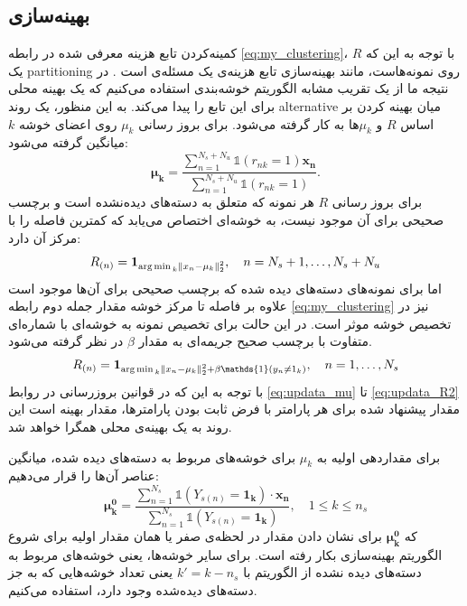 \subsection{بهینه‌سازی}\label{simple_opt}
 کمینه‌کردن تابع هزینه معرفی شده در رابطه
\eqref{eq:my_clustering}،
با توجه به این که $R$ یک \gls{partitioning} روی نمونه‌هاست، مانند بهینه‌سازی تابع هزینه‌ی  یک مسئله‌ی \nphard است \cite{kmeans_nphard}. در نتیجه ما از یک تقریب
مشابه الگوریتم خوشه‌بندی  استفاده می‌کنیم که یک بهینه محلی برای این تابع را پیدا می‌کند. به این منظور،  یک روند \gls{alternative}  میان بهینه کردن بر اساس $R$ و $\mu_k$ها به کار گرفته می‌شود. برای بروز رسانی $\mu_k$ روی اعضای خوشه $k$ میانگین گرفته می‌شود:
\begin{equation} \label{eq:updata_mu}
 \boldsymbol{\mu_k} = \frac{\sum_{n=1}^{N_s + N_u}  \mathds{1}(r_{nk}=1)\mathbf{x_n}}{\sum_{n=1}^{N_s+N_u}\mathds{1}(r_{nk}=1)}.
\end{equation}
برای بروز رسانی $R$ هر نمونه که متعلق به دسته‌های دیده‌نشده است و برچسب صحیحی برای آن موجود نیست، به خوشه‌ای اختصاص می‌یابد که کمترین فاصله را با مرکز آن دارد:
\begin{equation} \label{eq:updata_R}
R_{(n)} = \mathbf{1}_{\operatorname*{arg\,min\,}_k \left \lVert x_n - \mu_k \right \rVert_2^2}, \quad n=N_s+1,\ldots,N_s+N_u
\end{equation}
اما برای نمونه‌های دسته‌های دیده شده که برچسب صحیحی برای آن‌ها موجود است علاوه بر فاصله تا مرکز خوشه مقدار جمله دوم رابطه \eqref{eq:my_clustering} نیز در تخصیص خوشه موثر است. در این حالت برای تخصیص نمونه به خوشه‌ای با شماره‌ای متفاوت با برچسب صحیح جریمه‌ای به مقدار $\beta$ در نظر گرفته می‌شود.
\begin{align}\label{eq:updata_R2}
R_{(n)} = \mathbf{1}_{\argmin_k \normtwo{x_n - \mu_k} + \beta \mathds{1}(y_n \neq 1_k)}, \quad n=1,\ldots,N_s
\end{align}
با توجه به این که در قوانین بروزرسانی در روابط \eqref{eq:updata_mu} تا \eqref{eq:updata_R2} مقدار پیشنهاد شده برای هر پارامتر با فرض ثابت بودن پارامترها، مقدار بهینه است این روند به یک بهینه‌ی محلی همگرا خواهد شد.

برای مقداردهی اولیه به $\mu_k$ برای  خوشه‌های مربوط به دسته‌های دیده شده، میانگین عناصر آن‌ها را قرار می‌دهیم:
\begin{equation} \label{eq:init_mu}
 \boldsymbol{\mu_k^0} = \frac{\sum_{n=1}^{N_s}  \mathds{1}(Y_{s(n)} = \mathbf{1_k})\cdot \mathbf{x_n}}{\sum_{n=1}^{N_s}\mathds{1}(Y_{s(n)} = \mathbf{1_k})},
\quad 1 \leq k \leq n_s
\end{equation}
که $\boldsymbol{\mu_k^0} $ برای نشان دادن مقدار در لحظه‌ی صفر یا همان مقدار اولیه برای شروع الگوریتم بهینه‌سازی بکار رفته است.
برای سایر خوشه‌ها، یعنی خوشه‌های مربوط به دسته‌های دیده نشده از الگوریتم
 \cite{kmeanspp}
با $k' = k- n_s$ یعنی تعداد خوشه‌هایی که به جز دسته‌های دیده‌شده وجود دارد،
استفاده می‌کنیم.


